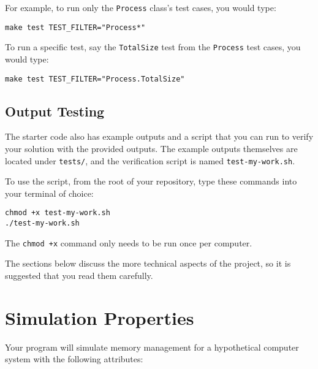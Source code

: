\documentclass[10pt]{article}
\begin{document}
For example, to run only the \texttt{Process} class's test cases, you would type:

\texttt{make test TEST\_FILTER="Process*"}

To run a specific test, say the \texttt{TotalSize} test from the \texttt{Process} test cases, you would type:

\texttt{make test TEST\_FILTER="Process.TotalSize"}

\subsection{Output Testing}

The starter code also has example outputs and a script that you can run to verify your solution with the provided outputs. The example outputs themselves are located under \texttt{tests/}, and the verification script is named \texttt{test-my-work.sh}.

To use the script, from the root of your repository, type these commands into your terminal of choice:

\begin{verbatim}
chmod +x test-my-work.sh
./test-my-work.sh
\end{verbatim}

The \texttt{chmod +x} command only needs to be run once per computer.

The sections below discuss the more technical aspects of the project, so it is suggested that you read them carefully.

\section{Simulation Properties}
\label{sec:sim_props}

Your program will simulate memory management for a hypothetical computer system with the following attributes:
\end{document}
